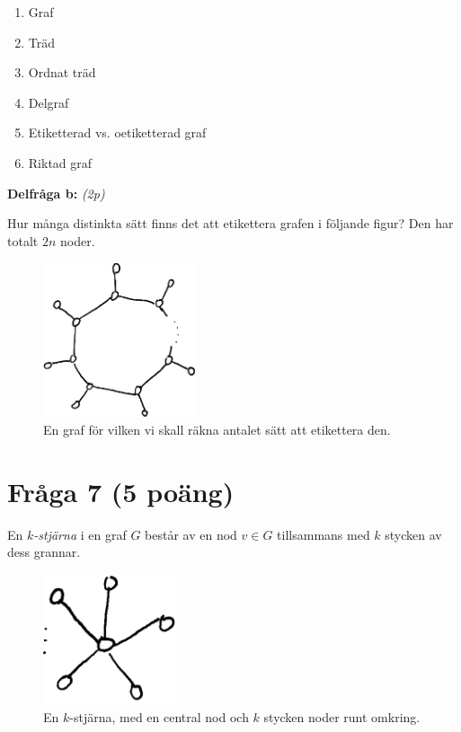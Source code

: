 \documentclass[nobib]{tufte-handout}
\begin{document}
\begin{enumerate}
    \item Graf
    \item Träd
    \item Ordnat träd
    \item Delgraf
    \item Etiketterad vs. oetiketterad graf
    \item Riktad graf
\end{enumerate}

\noindent\textbf{Delfråga b:} \emph{(2p)}

Hur många distinkta sätt finns det att etikettera grafen i följande figur? Den har totalt $2n$ noder.

\begin{figure}
    \centering
    \includegraphics[width=0.4\textwidth]{graphics/modelltenta_graph_labellings.png}
    \caption{En graf för vilken vi skall räkna antalet sätt att etikettera den.}
\end{figure}

\section{Fråga 7 (5 poäng)} %

En \emph{$k$-stjärna} i en graf $G$ består av en nod $v\in G$ tillsammans med $k$ stycken av dess grannar.

\begin{figure}
    \centering
    \includegraphics[width=0.35\textwidth]{graphics/modelltenta_star_graph.png}
    \caption{En $k$-stjärna, med en central nod och $k$ stycken noder runt omkring.}
\end{figure}
\end{document}
